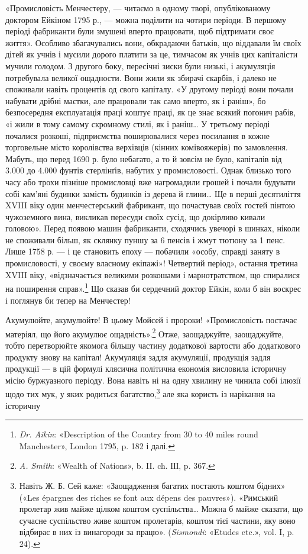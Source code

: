 «Промисловість Менчестеру, — читаємо в одному творі, опублікованому
доктором Ейкіном 1795 р., — можна поділити на
чотири періоди. В першому періоді фабриканти були змушені
вперто працювати, щоб підтримати своє життя». Особливо збагачувались
вони, обкрадаючи батьків, що віддавали їм своїх дітей
як учнів і мусили дорого платити за це, тимчасом як учнів цих
капіталісти мучили голодом. З другого боку, пересічні зиски
були низькі, і акумуляція потребувала великої ощадности.
Вони жили як збирачі скарбів, і далеко не споживали навіть
процентів од свого капіталу. «У другому періоді вони почали
набувати дрібні маєтки, але працювали так само вперто, як і
раніш», бо безпосередня експлуатація праці коштує праці, як
це знає всякий погонич рабів, «і жили в тому самому скромному
стилі, як і раніш\dots{} У третьому періоді почалися розкоші, підприємства
поширювалися через посилання в кожне торговельне
місто королівства верхівців (кінних комівояжерів) по замовлення.
Мабуть, що перед 1690 р. було небагато, а то й зовсім не було,
капіталів від 3.000 до 4.000 фунтів стерлінґів, набутих у промисловості.
Однак близько того часу або трохи пізніше промисловці
вже нагромадили грошей і почали будувати собі кам’яні
будинки замість будинків із дерева й глини\dots{} Ще в перші десятиліття
XVIII віку один менчестерський фабрикант, що почастував
своїх гостей пінтою чужоземного вина, викликав пересуди
своїх сусід, що докірливо кивали головою». Перед появою машин
фабриканти, сходячись увечорі в шинках, ніколи не споживали
більш, як склянку пуншу за 6 пенсів і жмут тютюну за 1 пенс.
Лише 1758 р. — і це становить епоху — побачили «особу, справді
заняту в промисловості, у своєму власному екіпажі»! Четвертий
період», остання третина XVIII віку, «відзначається великими
розкошами і марнотратством, що спиралися на поширення
справ».\footnote{
\emph{Dr. Aikin}: «Description of the Country from 30 to 40 miles round
Manchester», London 1795, p. 182 і далі.
} Що сказав би сердечний доктор Ейкін, коли б він
воскрес і поглянув би тепер на Менчестер!

Акумулюйте, акумулюйте! В цьому Мойсей і пророки! «Промисловість
постачає матеріял, що його акумулює ощадність».\footnote{
\emph{A. Smith}: «Wealth of Nations», b. II. ch. ІІІ, p. 367.
}
Отже, заощаджуйте, заощаджуйте, тобто перетворюйте якомога
більшу частину додаткової вартости або додаткового продукту
знову на капітал! Акумуляція задля акумуляції, продукція
задля продукції — в цій формулі клясична політична економія
висловила історичну місію буржуазного періоду. Вона навіть ні
на одну хвилину не чинила собі ілюзії щодо тих мук, у яких родиться
багатство,\footnote{
Навіть Ж. Б. Сей каже: «Заощадження багатих постають коштом
бідних» («Les épargnes des riches se font aux dépens des pauvres»). «Римський
пролетар жив майже цілком коштом суспільства\dots{} Можна б майже
сказати, що сучасне суспільство живе коштом пролетарів, коштом тієї
частини, яку воно відбирає в них із винагороди за працю». (\emph{Sismondi}:
«Etudes etc.», vol. I, p. 24).
} але яка користь із нарікання на історичну
\parbreak{}  %
